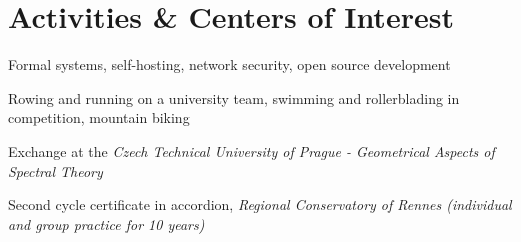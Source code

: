 \section{Activities \& Centers of Interest}

\begin{entryblock}
     Formal systems, self-hosting, network security, open source development
\end{entryblock}

\begin{entryblock}
     Rowing and running on a university team, swimming and rollerblading in competition, mountain biking
\end{entryblock}

\begin{entryblock}
    Exchange at the \textit{Czech Technical University of Prague - Geometrical Aspects of Spectral Theory}
\end{entryblock}

\begin{entryblock}
     Second cycle certificate in accordion, \textit{Regional Conservatory of Rennes (individual and group practice for 10 years)}
\end{entryblock}
